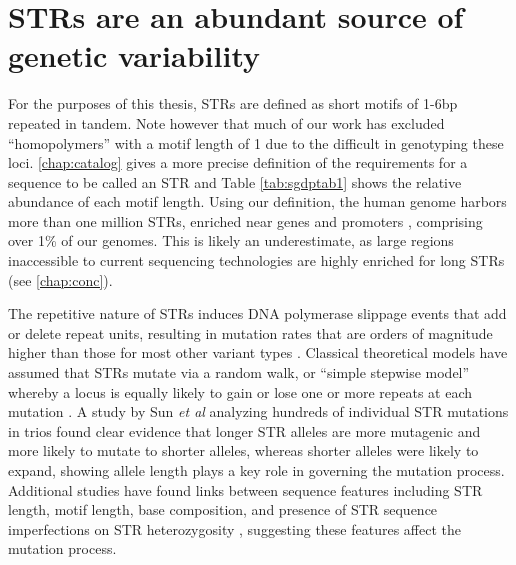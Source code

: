 \section{STRs are an abundant source of genetic variability}
For the purposes of this thesis, STRs are defined as short motifs of 1-6bp repeated in tandem. Note however that much of our work has excluded ``homopolymers'' with a motif length of 1 due to the difficult in genotyping these loci. \autoref{chap:catalog} gives a more precise definition of the requirements for a sequence to be called an STR and Table \ref{tab:sgdptab1} shows the relative abundance of each motif length. Using our definition, the human genome harbors more than one million STRs, enriched near genes and promoters \cite{SawayaBagshawBuschiazzoEtAl2013}, comprising over 1\% of our genomes. This is likely an underestimate, as large regions inaccessible to current sequencing technologies are highly enriched for long STRs (see \autoref{chap:conc}). 

The repetitive nature of STRs induces DNA polymerase slippage events that add or delete repeat units, resulting in mutation rates that are orders of magnitude higher than those for most other variant types \cite{Ellegren2004,WeberWong1993}. Classical theoretical models have assumed that STRs mutate via a random walk, or ``simple stepwise model'' whereby a locus is equally likely to gain or lose one or more repeats at each mutation \cite{Slatkin1995}. A study by Sun \emph{et al} \cite{SunHelgasonMassonEtAl2012} analyzing hundreds of individual STR mutations in trios found clear evidence that longer STR alleles are more mutagenic and more likely to mutate to shorter alleles, whereas shorter alleles were likely to expand, showing allele length plays a key role in governing the mutation process. Additional studies have found links between sequence features including STR length, motif length, base composition, and presence of STR sequence imperfections on STR heterozygosity \cite{ODushlaineShields2008}, suggesting these features affect the mutation process.

